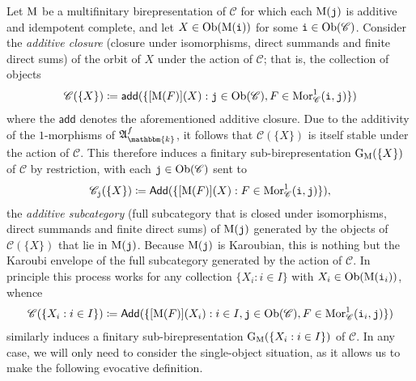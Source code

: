 \noindent Let $\textnormal{M}$ be a multifinitary birepresentation of $\mathscr{C}$ for which each $\textnormal{M}(\textnormal{\texttt{j}})$ is additive and idempotent complete, and let $X \in \textnormal{Ob}(\textnormal{M}(\textnormal{\texttt{i}}))$ for some $\textnormal{\texttt{i}} \in \textnormal{Ob}(\mathscr{C})$. Consider the {\em additive closure} (closure under isomorphisms, direct summands and finite direct sums) of the orbit of $X$ under the action of $\mathscr{C}$; that is, the collection of objects
\begin{align*}
\begin{split}
\mathscr{C}(\{X\}) \coloneqq \textsf{add}(\{[\textnormal{M}(F)](X) : \textnormal{\texttt{j}} \in \textnormal{Ob}(\mathscr{C}), F \in \textnormal{Mor}_\mathscr{C}^1(\textnormal{\texttt{i}}, \textnormal{\texttt{j}})\})
\end{split}
\end{align*}
\noindent where the $\textsf{add}$ denotes the aforementioned additive closure. Due to the additivity of the $1$-morphisms of $\mathfrak{A}_\mathbbm{k}^f$, it follows that $\mathscr{C}(\{X\})$ is itself stable under the action of $\mathscr{C}$. This therefore induces a finitary sub-birepresentation $\textnormal{G}_\textnormal{M}(\{X\})$ of $\mathscr{C}$ by restriction, with each $\textnormal{\texttt{j}} \in \textnormal{Ob}(\mathscr{C})$ sent to
\begin{align*}
\begin{split}
\mathscr{C}_{\textnormal{\texttt{j}}}(\{X\}) \coloneqq \textsf{Add}(\{[\textnormal{M}(F)](X) : F \in \textnormal{Mor}_\mathscr{C}^1(\textnormal{\texttt{i}}, \textnormal{\texttt{j}})\}),
\end{split}
\end{align*}
\noindent the {\em additive subcategory} (full subcategory that is closed under isomorphisms, direct summands and finite direct sums) of $\textnormal{M}(\textnormal{\texttt{j}})$ generated by the objects of $\mathscr{C}(\{X\})$ that lie in $\textnormal{M}(\textnormal{\texttt{j}})$. Because $\textnormal{M}(\textnormal{\texttt{j}})$ is Karoubian, this is nothing but the Karoubi envelope of the full subcategory generated by the action of $\mathscr{C}$. In principle this process works for any collection $\{X_i : i \in I\}$ with $X_i \in \textnormal{Ob}(\textnormal{M}(\textnormal{\texttt{i}}_i))$, whence
\begin{align*}
\begin{split}
\mathscr{C}(\{X_i : i \in I\}) \coloneqq \textsf{Add}(\{[\textnormal{M}(F)](X_i) : i \in I, \textnormal{\texttt{j}} \in \textnormal{Ob}(\mathscr{C}), F \in \textnormal{Mor}_\mathscr{C}^1(\textnormal{\texttt{i}}_i, \textnormal{\texttt{j}})\})
\end{split}
\end{align*}
\noindent similarly induces a finitary sub-birepresentation $\textnormal{G}_\textnormal{M}(\{X_i : i \in I\})$ of $\mathscr{C}$. In any case, we will only need to consider the single-object situation, as it allows us to make the following evocative definition.\\

